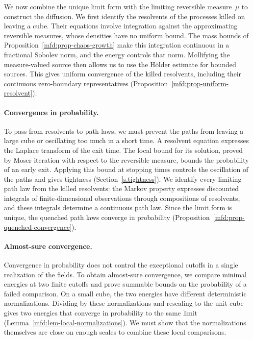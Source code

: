 \documentclass[11pt]{amsart}
\begin{document}
We now combine the unique limit form with the limiting reversible measure~$\mu$ to construct the diffusion. We first identify the resolvents of the processes killed on leaving a cube. Their equations involve integration against the approximating reversible measures, whose densities have no uniform bound. The mass bounds of Proposition~\ref{mfd:prop-chaos-growth} make this integration continuous in a fractional Sobolev norm, and the energy controls that norm. Mollifying the measure-valued source then allows us to use the H\"older estimate for bounded sources. This gives uniform convergence of the killed resolvents, including their continuous zero-boundary representatives (Proposition~\ref{mfd:prop-uniform-resolvent}).

\paragraph{Convergence in probability.}
To pass from resolvents to path laws, we must prevent the paths from leaving a large cube or oscillating too much in a short time. A resolvent equation expresses the Laplace transform of the exit time. The local bound for its solution, proved by Moser iteration with respect to the reversible measure, bounds the probability of an early exit. Applying this bound at stopping times controls the oscillation of the paths and gives tightness (Section~\ref{s.tightness}). We identify every limiting path law from the killed resolvents: the Markov property expresses discounted integrals of finite-dimensional observations through compositions of resolvents, and these integrals determine a continuous path law. Since the limit form is unique, the quenched path laws converge in probability (Proposition~\ref{mfd:prop-quenched-convergence}).

\paragraph{Almost-sure convergence.}
Convergence in probability does not control the exceptional cutoffs in a single realization of the fields. To obtain almost-sure convergence, we compare minimal energies at two finite cutoffs and prove summable bounds on the probability of a failed comparison. On a small cube, the two energies have different deterministic normalizations. Dividing by these normalizations and rescaling to the unit cube gives two energies that converge in probability to the same limit (Lemma~\ref{mfd:lem-local-normalizations}). We must show that the normalizations themselves are close on enough scales to combine these local comparisons.
\end{document}
